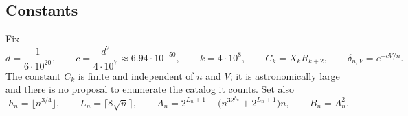 \documentclass[11pt,letterpaper]{article}
\theoremstyle{plain}
\theoremstyle{definition}
\theoremstyle{remark}
\numberwithin{equation}{section}
\begin{document}
\subsection{Constants}
Fix
\begin{equation}\label{eq:constants}
 d=\frac1{6\cdot10^{20}},\qquad c=\frac{d^2}{4\cdot10^{7}}\approx6.94\cdot10^{-50},\qquad
 k=4\cdot10^{8},\qquad C_k=X_kR_{k+2},\qquad \delta_{n,V}=e^{-cV/n}.
\end{equation}
The constant $C_k$ is finite and independent of $n$ and $V$; it is astronomically large and there is no proposal to enumerate the catalog it counts. Set also
\begin{equation}\label{eq:budget}
 h_n=\lfloor n^{3/4}\rfloor,\qquad L_n=\lceil8\sqrt n\rceil,\qquad
 A_n=2^{L_n+1}+\bigl(n^32^{h_n}+2^{L_n+1}\bigr)n,\qquad B_n=A_n^2 .
\end{equation}
\end{document}
